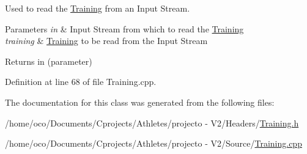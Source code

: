 Used to read the \hyperlink{class_training}{Training} from an Input Stream. 


\begin{DoxyParams}{Parameters}
{\em in} & Input Stream from which to read the \hyperlink{class_training}{Training} \\
\hline
{\em training} & \hyperlink{class_training}{Training} to be read from the Input Stream \\
\hline
\end{DoxyParams}
\begin{DoxyReturn}{Returns}
in (parameter) 
\end{DoxyReturn}


Definition at line 68 of file Training.\+cpp.



The documentation for this class was generated from the following files\+:\begin{DoxyCompactItemize}
\item 
/home/oco/\+Documents/\+Cprojects/\+Athletes/projecto -\/ V2/\+Headers/\hyperlink{_training_8h}{Training.\+h}\item 
/home/oco/\+Documents/\+Cprojects/\+Athletes/projecto -\/ V2/\+Source/\hyperlink{_training_8cpp}{Training.\+cpp}\end{DoxyCompactItemize}
